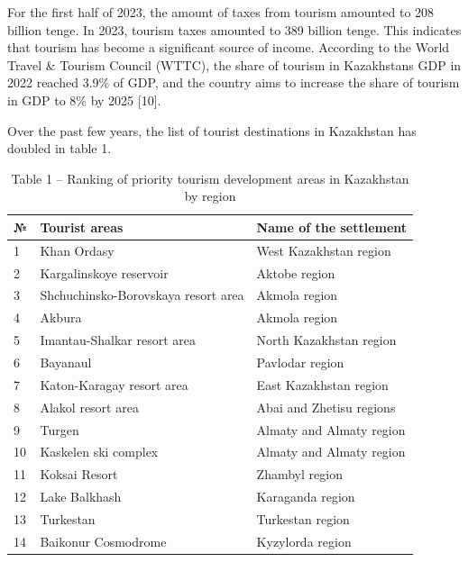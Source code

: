 \begin{multicols}{2}
For the first half of 2023, the amount of taxes from tourism amounted to
208 billion tenge. In 2023, tourism taxes amounted to 389 billion tenge.
This indicates that tourism has become a significant source of income.
According to the World Travel \& Tourism Council (WTTC), the share of
tourism in Kazakhstan\textquotesingle s GDP in 2022 reached 3.9\% of
GDP, and the country aims to increase the share of tourism in GDP to 8\%
by 2025 {[}10{]}.

Over the past few years, the list of tourist destinations in Kazakhstan
has doubled in table 1.
\end{multicols}

\begin{table}[H]
\caption*{Table 1 -- Ranking of priority tourism development areas in Kazakhstan by region}
\centering
\begin{tabular}{|l|l|l|}
\hline
№  & Tourist areas                       & Name of the settlement   \\ \hline
1  & Khan Ordasy                         & West Kazakhstan region   \\ \hline
2  & Kargalinskoye reservoir             & Aktobe region            \\ \hline
3  & Shchuchinsko-Borovskaya resort area & Akmola region            \\ \hline
4  & Akbura                              & Akmola region            \\ \hline
5  & Imantau-Shalkar resort area         & North Kazakhstan region  \\ \hline
6  & Bayanaul                            & Pavlodar region          \\ \hline
7  & Katon-Karagay resort area           & East Kazakhstan region   \\ \hline
8  & Alakol resort area                  & Abai and Zhetisu regions \\ \hline
9  & Turgen                              & Almaty and Almaty region \\ \hline
10 & Kaskelen ski complex                & Almaty and Almaty region \\ \hline
11 & Koksai Resort                       & Zhambyl region           \\ \hline
12 & Lake Balkhash                       & Karaganda region         \\ \hline
13 & Turkestan                           & Turkestan region         \\ \hline
14 & Baikonur Cosmodrome                 & Kyzylorda region         \\ \hline

\end{tabular}
\end{table}
